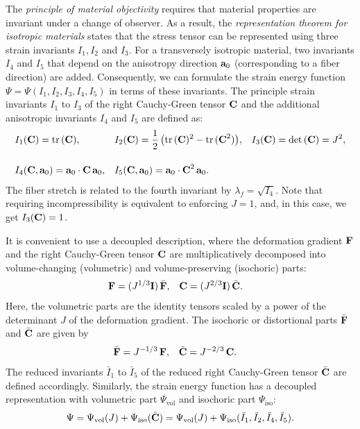 The \emph{principle of material objectivity} requires that material properties are invariant under a change of observer. As a result, the \emph{representation theorem for isotropic materials} states that the stress tensor can be represented using three strain invariants $I_1, I_2$ and $I_3$. For a transversely isotropic material, two invariants $I_4$ and $I_5$ that depend on the anisotropy direction $\textbf{a}_0$ (corresponding to a fiber direction) are added.
Consequently, we can formulate the strain energy function $\Psi=\Psi(I_1,I_2,I_3,I_4,I_5)$ in terms of these invariants. The principle strain invariants $I_1$ to $I_3$ of the right Cauchy-Green tensor $\textbf{C}$ and the additional anisotropic invariants $I_4$ and $I_5$ are defined as:
\begin{align*}
  &I_1(\textbf{C}) = \hbox{tr} \,(\textbf{C}),  &
  &I_2(\textbf{C}) = \displaystyle\frac{\displaystyle{1}}{\displaystyle{2}}\,\big(\hbox{tr} \,(\textbf{C})^2 - \hbox{tr} \,(\textbf{C}^2)\big), &
  I_3(\textbf{C}) = \hbox{det} \,(\textbf{C}) = J^2,\\[4mm]
  &I_4(\textbf{C},\textbf{a}_0) = \textbf{a}_0 \cdot \textbf{C} \, \textbf{a}_0, &
  &I_5(\textbf{C},\textbf{a}_0) = \textbf{a}_0 \cdot \textbf{C}^2 \, \textbf{a}_0. &
\end{align*}
The fiber stretch is related to the fourth invariant by $\lambda_f = \sqrt{I_4}$. Note that requiring incompressibility is equivalent to enforcing $J=1$, and, in this case, we get ${I_3(\textbf{C}) = 1}$. 

It is convenient to use a decoupled description, where the deformation gradient $\textbf{F}$ and the right Cauchy-Green tensor $\textbf{C}$ are multiplicatively decomposed into volume-changing (volumetric) and volume-preserving (isochoric) parts:%
\begin{align*}
  \textbf{F} &= (J^{1/3}\textbf{I})\,\bar{\textbf{F}},  & \textbf{C} &= (J^{2/3}\textbf{I})\,\bar{\textbf{C}}.
\end{align*}
%
Here, the volumetric parts are the identity tensors scaled by a power of the determinant $J$ of the deformation gradient. The isochoric or distortional parts $\bar{\textbf{F}}$ and $\bar{\textbf{C}}$ are given by%
\begin{align*}
  \bar{\textbf{F}} &= J^{-1/3}\,\textbf{F},  & \bar{\textbf{C}} &= J^{-2/3}\,\textbf{C}.
\end{align*}
The reduced invariants $\bar{I}_1$ to $\bar{I}_5$ of the reduced right Cauchy-Green tensor $\bar{\textbf{C}}$ are defined accordingly.
Similarly, the strain energy function has a decoupled representation with volumetric part $\Psi_\text{vol}$ and isochoric part $\Psi_\text{iso}$:
\begin{align*}
  \Psi = \Psi_\text{vol}(J) + \Psi_\text{iso}(\bar{\textbf{C}}) = \Psi_\text{vol}(J) + \Psi_\text{iso}(\bar{I}_1,\bar{I}_2,\bar{I}_4,\bar{I}_5).
\end{align*}


